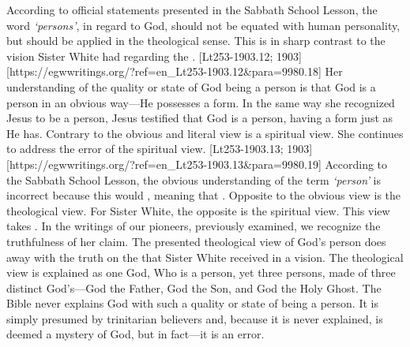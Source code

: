 According to official statements presented in the Sabbath School Lesson, the word \textit{‘persons’},\textit{ }in regard to God, should not be equated with human personality, but should be applied in the theological sense. This is in sharp contrast to the vision Sister White had regarding the . [Lt253-1903.12; 1903][https://egwwritings.org/?ref=en\_Lt253-1903.12&para=9980.18] Her understanding of the quality or state of God being a person is that God is a person in an obvious way—He possesses a form. In the same way she recognized Jesus to be a person, Jesus testified that God is a person, having a form just as He has. Contrary to the obvious and literal view is a spiritual view. She continues to address the error of the spiritual view. [Lt253-1903.13; 1903][https://egwwritings.org/?ref=en\_Lt253-1903.13&para=9980.19] According to the Sabbath School Lesson, the obvious understanding of the term \textit{‘person’ }is incorrect because this would , meaning that . Opposite to the obvious view is the theological view. For Sister White, the opposite is the spiritual view. This view takes . In the writings of our pioneers, previously examined, we recognize the truthfulness of her claim. The presented theological view of God’s person does away with the truth on the  that Sister White received in a vision. The theological view is explained as one God, Who is a person, yet three persons, made of three distinct God’s—God the Father, God the Son, and God the Holy Ghost. The Bible never explains God with such a quality or state of being a person. It is simply presumed by trinitarian believers and, because it is never explained, is deemed a mystery of God, but in fact—it is an error.


